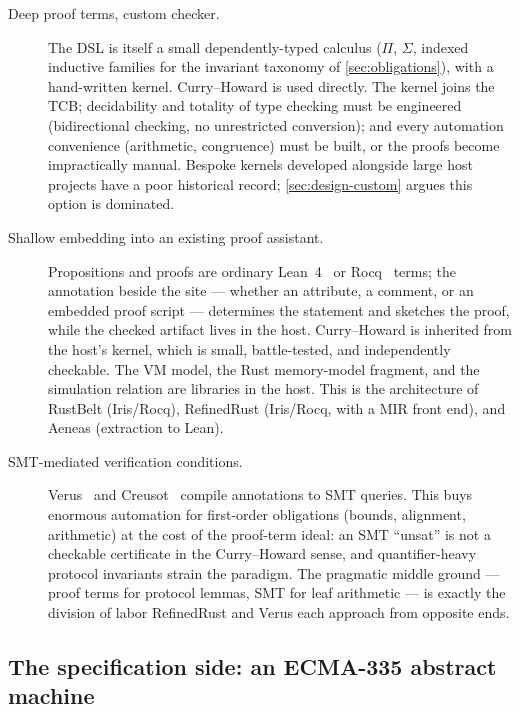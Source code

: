 \begin{description}
\item[Deep proof terms, custom checker.] The DSL is itself a small
  dependently-typed calculus ($\Pi$, $\Sigma$, indexed inductive families
  for the invariant taxonomy of \cref{sec:obligations}), with a
  hand-written kernel. Curry--Howard is used directly. The kernel joins
  the TCB; decidability and totality of type checking must be engineered
  (bidirectional checking, no unrestricted conversion); and every
  automation convenience (arithmetic, congruence) must be built, or
  the proofs become impractically manual. Bespoke kernels developed
  alongside large host projects have a poor historical record;
  \cref{sec:design-custom} argues this option is dominated.
\item[Shallow embedding into an existing proof assistant.] Propositions
  and proofs are ordinary Lean~4~\cite{lean4} or Rocq~\cite{rocq}
  terms; the annotation beside the  site --- whether an
  attribute, a comment, or an embedded proof script --- determines the
  statement and sketches the proof, while the checked artifact lives
  in the host. Curry--Howard is
  inherited from the host's kernel, which is small, battle-tested, and
  independently checkable. The VM model, the Rust memory-model fragment,
  and the simulation relation are libraries in the host. This is the
  architecture of RustBelt (Iris/Rocq), RefinedRust (Iris/Rocq, with a
  MIR front end), and Aeneas (extraction to Lean).
\item[SMT-mediated verification conditions.] Verus~\cite{verus2024} and
  Creusot~\cite{creusot2022} compile annotations to SMT queries. This
  buys enormous automation for first-order obligations (bounds,
  alignment, arithmetic) at the cost of the proof-term ideal: an SMT
  ``unsat'' is not a checkable certificate in the Curry--Howard sense,
  and quantifier-heavy protocol invariants strain the paradigm. The
  pragmatic middle ground --- proof terms for protocol lemmas, SMT for
  leaf arithmetic --- is exactly the division of labor RefinedRust and
  Verus each approach from opposite ends.
\end{description}

\subsection{The specification side: an ECMA-335 abstract machine}
\label{sec:theory-vesmodel}

